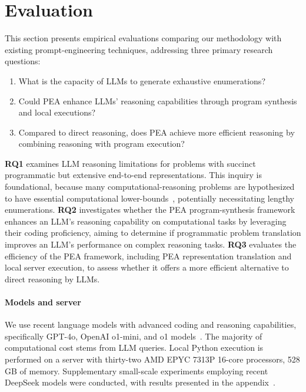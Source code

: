 \section{Evaluation}
This section presents empirical evaluations comparing our methodology with existing prompt-engineering techniques, addressing three primary research questions:
\begin{tcolorbox}
\begin{enumerate}[start=1,label={\bfseries RQ\arabic*:}]
\item What is the capacity of LLMs to generate exhaustive enumerations?
\item Could PEA enhance LLMs' reasoning capabilities through program synthesis and local executions?
\item 
Compared to direct reasoning, does PEA achieve more efficient reasoning by combining reasoning with program execution?
\end{enumerate}
\end{tcolorbox}
\textbf{RQ1} examines LLM reasoning limitations for problems with succinct programmatic but extensive end-to-end representations. This inquiry is foundational, because many computational-reasoning problems are hypothesized to have essential computational lower-bounds~\citep{SETH,fgc}, potentially necessitating lengthy enumerations.
\textbf{RQ2} investigates whether the PEA
program-synthesis framework enhances an LLM's reasoning capability on computational tasks by leveraging their coding proficiency,
aiming to determine if programmatic problem translation improves
an LLM's
performance on complex reasoning tasks.
\textbf{RQ3} evaluates the efficiency of the PEA framework, including PEA representation translation and local server execution, to assess whether it offers a more efficient alternative to direct reasoning by LLMs.

\paragraph{Models and server}We use recent language models with advanced coding and reasoning capabilities, specifically GPT-4o, OpenAI o1-mini, and o1 models~\citep{openai2024gpt4technicalreport}. The majority of computational cost 
stems from LLM queries. Local Python execution is performed on a server with thirty-two AMD EPYC 7313P 16-core processors, 528 GB of memory. Supplementary small-scale experiments employing recent DeepSeek models were conducted, with results presented in the appendix~\citep{deepseekai2024deepseekv3technicalreport,deepseekai2025deepseekr1incentivizingreasoningcapability}.

